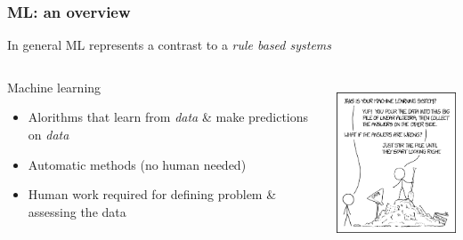 \documentclass{beamer}
\begin{document}
\begin{frame}
    \frametitle{ML: an overview}
    \vspace*{-7mm}
    In general ML represents a contrast to a \emph{rule based systems}
    \begin{columns}[T] %
        \begin{column}{.48\textwidth}
            \begin{block}{Machine learning}
                \begin{itemize}
                    \item<1-> Alorithms that learn from \emph{data} \& make predictions on \emph{data}
                    \item<2-> Automatic methods (no human needed)
                    \item<3-> Human work required for defining problem \& assessing the data
                \end{itemize}
            \end{block}
        \end{column}%
        \hfill%
        \begin{column}{.48\textwidth}
            \includegraphics[height=5cm,keepaspectratio]{pics/machine_learning.png}%
            
        \end{column}%
    \end{columns}
\end{frame}

\end{document}
